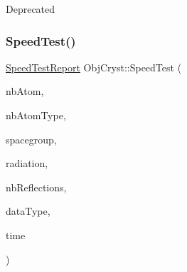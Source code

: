 \begin{DoxyRefDesc}{Deprecated}
\item[\mbox{\hyperlink{deprecated__deprecated000012}{Deprecated}}]\end{DoxyRefDesc}
\mbox{\label{namespace_obj_cryst_a775b62d07c596365d2f2d021dca408db}} 
\subsubsection{\texorpdfstring{SpeedTest()}{SpeedTest()}}
{\footnotesize\ttfamily \mbox{\hyperlink{struct_obj_cryst_1_1_speed_test_report}{Speed\+Test\+Report}} Obj\+Cryst\+::\+Speed\+Test (\begin{DoxyParamCaption}\item[{const unsigned int}]{nb\+Atom,  }\item[{const int}]{nb\+Atom\+Type,  }\item[{const string}]{spacegroup,  }\item[{const \mbox{\hyperlink{namespace_obj_cryst_a48fe50a094c607f8897378934d3d73ef}{Radiation\+Type}}}]{radiation,  }\item[{const unsigned long}]{nb\+Reflections,  }\item[{const unsigned int}]{data\+Type,  }\item[{const R\+E\+AL}]{time }\end{DoxyParamCaption})}


